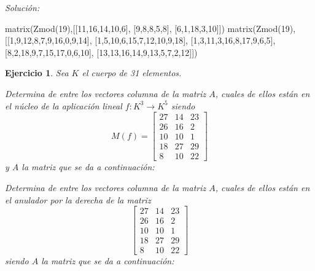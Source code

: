 \documentclass[12pt]{amsart}
\newtheorem{ejer}{Ejercicio}
\begin{document}
{\it Soluci\'on:}

\begin{sageblock}
matrix(Zmod(19),[[11,16,14,10,6],
[9,8,8,5,8],
[6,1,18,3,10]])
matrix(Zmod(19),[[1,9,12,8,7,9,16,0,9,14],
[1,5,10,6,15,7,12,10,9,18],
[1,3,11,3,16,8,17,9,6,5],
[8,2,18,9,7,15,17,0,6,10],
[13,13,16,14,9,13,5,7,2,12]])
\end{sageblock}



\begin{ejer} Sea $K$ el cuerpo de 31 elementos.
\newline
\noindent\begin{minipage}{\textwidth}
\begin{tcolorbox}[colback = green!20!white,title=Versión Núcleo]
Determina de entre los vectores columna de la matriz $A$, cuales de ellos están en el núcleo de la aplicación lineal $f:K^{3} \to K^{5}$ siendo  $$ M(f) = \left[\begin{array}{rrr}
27 & 14 & 23 \\
26 & 16 & 2 \\
10 & 10 & 1 \\
18 & 27 & 29 \\
8 & 10 & 22
\end{array}\right] $$ y $A$ la matriz que se da a continuación:\end{tcolorbox}
\end{minipage} \newline
\noindent\begin{minipage}{\textwidth}
\begin{tcolorbox}[colback = blue!20!white,title=Versión Anulador]
Determina de entre los vectores columna de la matriz $A$, cuales de ellos están en el anulador por la derecha de la matriz $$ \left[\begin{array}{rrr}
27 & 14 & 23 \\
26 & 16 & 2 \\
10 & 10 & 1 \\
18 & 27 & 29 \\
8 & 10 & 22
\end{array}\right] $$ siendo $A$ la matriz que se da a continuación:\end{tcolorbox}
\end{minipage} \newline
\noindent\begin{minipage}{\textwidth} 
\begin{tcolorbox}[colback = red!20!white,title=Versión Ecuaciones Implícitas]

\end{tcolorbox}
\end{minipage}
\end{ejer}
\end{document}
